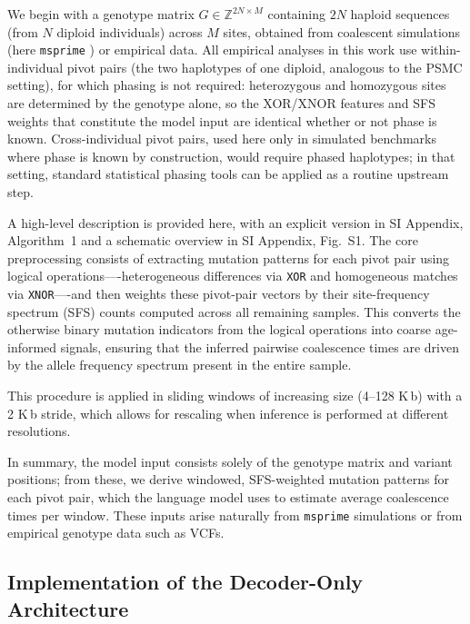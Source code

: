 \documentclass[9pt,twocolumn,twoside]{pnas-new}
\begin{document}
{We begin with a genotype matrix $G \in \mathbb{Z}^{2N \times M}$ 
containing $2N$ haploid sequences (from $N$ diploid individuals) across $M$ sites, 
obtained from coalescent simulations (here \texttt{msprime} \cite{baumdicker2022efficient}) or empirical data. 
All empirical analyses in this work use within-individual pivot pairs 
(the two haplotypes of one diploid, analogous to the PSMC setting), 
for which phasing is not required:
heterozygous and homozygous sites are determined by the genotype alone, 
so the XOR/XNOR features and SFS weights that constitute the model input 
are identical whether or not phase is known.
Cross-individual pivot pairs, used here only in simulated benchmarks 
where phase is known by construction, 
would require phased haplotypes; 
in that setting, standard statistical phasing tools 
can be applied as a routine upstream step.

A high-level description is provided here, 
with an explicit version in SI Appendix, Algorithm~1 
and a schematic overview in SI Appendix, Fig.~S1. 
The core preprocessing consists of extracting mutation patterns for each pivot pair
using logical operations—-heterogeneous differences via \texttt{XOR} 
and homogeneous matches via \texttt{XNOR}—-and then weights these pivot-pair vectors
by their site-frequency spectrum (SFS) counts computed across all remaining samples. 
This converts the otherwise binary mutation indicators from the logical operations
into coarse age-informed signals, 
ensuring that the inferred pairwise coalescence times are driven 
by the allele frequency spectrum present in the entire sample.

This procedure is applied in sliding windows of increasing size (4–128 K\,b)
with a 2 K\,b stride, which allows for rescaling when
inference is performed at different resolutions. 

In summary, the model input consists solely of the genotype matrix and variant positions; 
from these, we derive windowed, SFS-weighted mutation patterns for each pivot pair, 
which the language model uses to estimate average coalescence times per window. 
These inputs arise naturally from \texttt{msprime} simulations or from empirical genotype data such as VCFs.


\subsection*{Implementation of the Decoder-Only Architecture}

}
\end{document}
